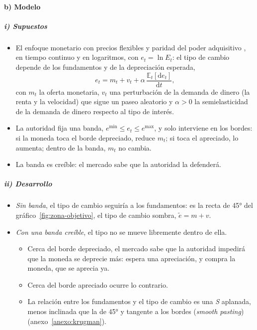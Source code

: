 \documentclass[11pt]{article}
\begin{document}
\paragraph{b) Modelo}

\subparagraph{i) Supuestos}

\begin{itemize}
\item El enfoque monetario con precios flexibles y paridad del poder adquisitivo , en tiempo continuo y en logaritmos, con $e_t=\ln E_t$: el tipo de cambio depende de los fundamentos y de la depreciación esperada,
  \begin{equation}\label{eq:zona-objetivo}
  e_t=m_t+v_t+\alpha\,\frac{\mathbb{E}_t[\mathrm{d}e_t]}{\mathrm{d}t},
  \end{equation}
  con $m_t$ la oferta monetaria, $v_t$ una perturbación de la demanda de dinero (la renta y la velocidad) que sigue un paseo aleatorio y $\alpha>0$ la semielasticidad de la demanda de dinero respecto al tipo de interés.
\item La autoridad fija una banda, $e^{\min}\leq e_t\leq e^{\max}$, y solo interviene en los bordes: si la moneda toca el borde depreciado, reduce $m_t$; si toca el apreciado, lo aumenta; dentro de la banda, $m_t$ no cambia.
\item La banda es creíble: el mercado sabe que la autoridad la defenderá.
\end{itemize}

\subparagraph{ii) Desarrollo}

\begin{itemize}
\item \emph{Sin banda}, el tipo de cambio seguiría a los fundamentos: es la recta de 45° del gráfico~\ref{fig:zona-objetivo}, el tipo de cambio sombra, $\tilde e=m+v$.
\item \emph{Con una banda creíble}, el tipo no se mueve libremente dentro de ella.
  \begin{itemize}
  \item Cerca del borde depreciado, el mercado sabe que la autoridad impedirá que la moneda se deprecie más: espera una apreciación, y compra la moneda, que se aprecia ya.
  \item Cerca del borde apreciado ocurre lo contrario.
  \item La relación entre los fundamentos y el tipo de cambio es una \emph{S} aplanada, menos inclinada que la de 45° y tangente a los bordes (\emph{smooth pasting}) (anexo~\ref{anexo:krugman}).
  \end{itemize}
\end{itemize}
\end{document}
